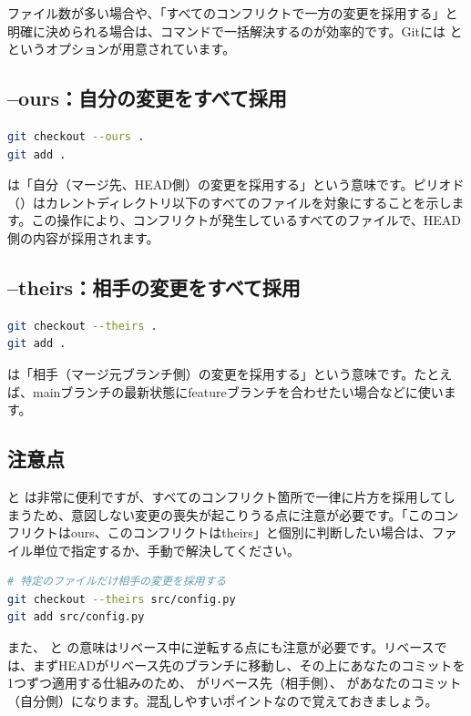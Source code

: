 ファイル数が多い場合や、「すべてのコンフリクトで一方の変更を採用する」と明確に決められる場合は、コマンドで一括解決するのが効率的です。Gitには  と  というオプションが用意されています。

\subsection{--ours：自分の変更をすべて採用}

\begin{lstlisting}[language=bash]
git checkout --ours .
git add .
\end{lstlisting}

 は「自分（マージ先、HEAD側）の変更を採用する」という意味です。ピリオド（）はカレントディレクトリ以下のすべてのファイルを対象にすることを示します。この操作により、コンフリクトが発生しているすべてのファイルで、HEAD側の内容が採用されます。

\subsection{--theirs：相手の変更をすべて採用}

\begin{lstlisting}[language=bash]
git checkout --theirs .
git add .
\end{lstlisting}

 は「相手（マージ元ブランチ側）の変更を採用する」という意味です。たとえば、mainブランチの最新状態にfeatureブランチを合わせたい場合などに使います。

\subsection{注意点}

 と  は非常に便利ですが、すべてのコンフリクト箇所で一律に片方を採用してしまうため、意図しない変更の喪失が起こりうる点に注意が必要です。「このコンフリクトはours、このコンフリクトはtheirs」と個別に判断したい場合は、ファイル単位で指定するか、手動で解決してください。

\begin{lstlisting}[language=bash]
# 特定のファイルだけ相手の変更を採用する
git checkout --theirs src/config.py
git add src/config.py
\end{lstlisting}

また、 と  の意味はリベース中に逆転する点にも注意が必要です。リベースでは、まずHEADがリベース先のブランチに移動し、その上にあなたのコミットを1つずつ適用する仕組みのため、 がリベース先（相手側）、 があなたのコミット（自分側）になります。混乱しやすいポイントなので覚えておきましょう。

